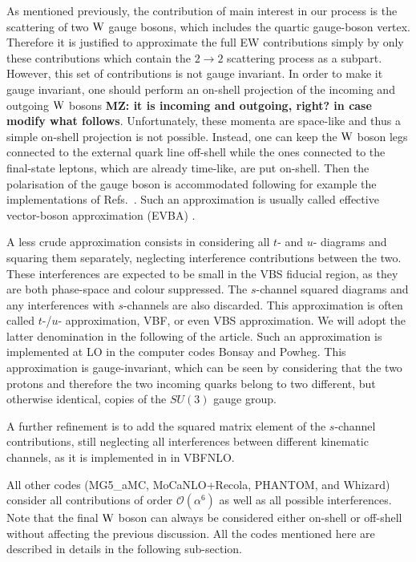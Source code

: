 As mentioned previously, the contribution of main interest in our process is
the scattering of two $\text{W}$ gauge bosons, which includes the quartic gauge-boson vertex.
Therefore it is justified to approximate the full EW contributions simply by only these contributions which contain the $2\rightarrow 2$ scattering process as a subpart.
However, this set of contributions is not gauge invariant. In order to make it gauge invariant, one 
should perform an on-shell projection of the incoming and outgoing $\text{W}$ bosons {\bf MZ: it is incoming and outgoing, right? in case modify what follows}.
Unfortunately, these momenta are space-like and thus a simple on-shell projection is not possible.
Instead, one can keep the $\text{W}$ boson legs connected to the external quark line off-shell while the ones connected to the final-state leptons, which are already time-like, are put on-shell.
Then the polarisation of the gauge boson is accommodated following for example the implementations of Refs.~\cite{Kuss:1995yv,Accomando:2006hq}.
Such an approximation is usually called effective vector-boson approximation (EVBA) \cite{Dawson:1984gx,Duncan:1985vj,Cahn:1983ip}.

A less crude approximation consists in considering all $t$- and $u$- diagrams and squaring them separately, neglecting interference contributions between the two.
These interferences are expected to be small in the VBS fiducial region, as they are both phase-space and colour suppressed.
The $s$-channel squared diagrams and any interferences with $s$-channels are also discarded.
This approximation is often called $t$-/$u$- approximation, VBF, or even VBS approximation.
We will adopt the latter denomination in the following of the article.
Such an approximation is implemented at LO in the computer codes {\sc Bonsay} and {\sc Powheg}.
This approximation is gauge-invariant, which can be seen by considering that the two protons and therefore the two incoming quarks belong to two different, but otherwise identical, copies of the $SU \left(3\right)$ gauge group.

A further refinement is to add the squared matrix element of the $s$-channel contributions, still neglecting 
all interferences between different kinematic channels, as it is implemented in in {\sc VBFNLO}.

All other codes ({\sc MG5\_aMC}, {\sc MoCaNLO+Recola}, {\sc PHANTOM}, and {\sc Whizard}) consider all contributions of order $\mathcal{O}{\left(\alpha^{6}\right)}$ as well as all possible interferences.
Note that the final $\text{W}$ boson can always be considered either on-shell or off-shell without affecting the previous discussion.
All the codes mentioned here are described in details in the following sub-section.


